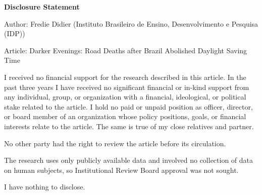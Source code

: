 \documentclass[12pt]{article}
\begin{document}
\begin{center}\Large\textbf{Disclosure Statement}\end{center}

Author: Fredie Didier (Instituto Brasileiro de Ensino, Desenvolvimento e Pesquisa (IDP))

Article: Darker Evenings: Road Deaths after Brazil Abolished Daylight Saving Time

I received no financial support for the research described in this article. In the past three years I have received no significant financial or in-kind support from any individual, group, or organization with a financial, ideological, or political stake related to the article. I hold no paid or unpaid position as officer, director, or board member of an organization whose policy positions, goals, or financial interests relate to the article. The same is true of my close relatives and partner.

No other party had the right to review the article before its circulation.

The research uses only publicly available data and involved no collection of data on human subjects, so Institutional Review Board approval was not sought.

I have nothing to disclose.
\end{document}
